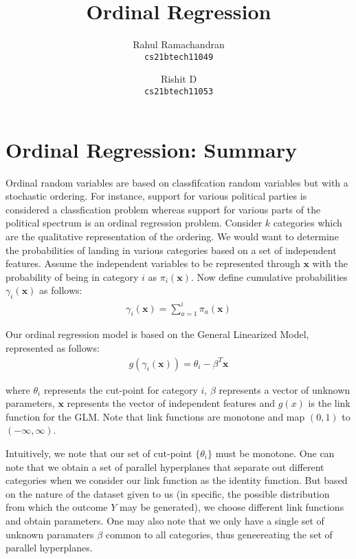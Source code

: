 \documentclass[a4paper, 11pt]{article}
\title{Ordinal Regression}
\author{
  Rahul Ramachandran\\
  \texttt{cs21btech11049}
  \and
  Rishit D\\
  \texttt{cs21btech11053}
}
\begin{document}
\maketitle
\tableofcontents

\section{Ordinal Regression: Summary}
Ordinal random variables are based on classfifcation random variables but with a stochastic ordering. For instance, support for various political parties is considered a classfication problem whereas support for various parts of the political spectrum is an ordinal regression problem.
Consider $k$ categories which are the qualitative representation of the ordering. We would want to determine the probabilities of landing in various categories based on a set of independent features.
\newline
Assume the independent variables to be represented through $\textbf{x}$ with the probability of being in category $i$ as $\pi_i(\textbf{x})$. Now define cumulative probabilities $\gamma_i(\textbf{x})$ as follows: \newline
\begin{align}
    \gamma_i(\textbf{x}) = \sum_{a=1}^{i} \pi_a(\textbf{x})
\end{align}

Our ordinal regression model is based on the General Linearized Model, represented as follows:
\begin{align}
    g(\gamma_i(\textbf{x})) = \theta_i - \beta^T\textbf{x} 
\end{align}

where $\theta_i$ represents the cut-point for category $i$, $\beta$ represents a vector of unknown parameters, $\textbf{x}$ represents the vector of independent features and $g(x)$ is the link function for the GLM.
Note that link functions are monotone and map $(0, 1)$ to $(-\infty, \infty)$. \newline

Intuitively, we note that our set of cut-point $\{\theta_i\}$ must be monotone. One can note that we obtain a set of parallel hyperplanes that separate out different categories when we consider our link function as the identity function.
But based on the nature of the dataset given to us (in specific, the possible distribution from which the outcome $Y$ may be generated), we choose different link functions and obtain parameters. One may also note that we only have a single set of unknown paramaters $\beta$ common to all categories, thus geneereating the set of parallel hyperplanes. \newline
\end{document}

